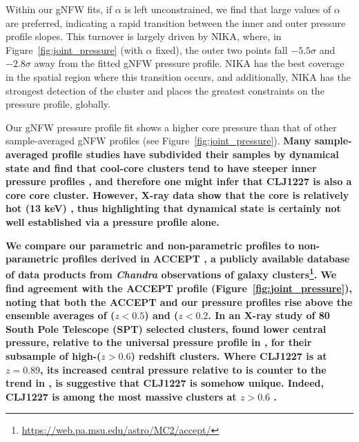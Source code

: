 \documentclass[twocolumn,traditabstract]{aa}
\begin{document}
Within our gNFW fits, if $\alpha$ is left unconstrained, we find that large values of $\alpha$ are preferred, indicating a
rapid transition between the inner and outer pressure profile slopes. This turnover is largely driven by NIKA, where, in
Figure~\ref{fig:joint_pressure} (with $\alpha$ fixed), the outer two points fall $-5.5\sigma$ and $-2.8\sigma$ away from
the fitted gNFW pressure profile. NIKA has the best coverage in the spatial region where this transition occurs, and additionally,
NIKA has the strongest detection of the cluster and places the greatest constraints on the pressure profile, globally.



Our gNFW pressure profile fit shows a higher core pressure than that of other sample-averaged gNFW profiles
(see Figure~\ref{fig:joint_pressure}). \textbf{Many sample-averaged profile studies have subdivided their
  samples by dynamical state and find that cool-core clusters tend to have steeper inner pressure profiles
  \citep[e.g.][]{arnaud2010,planck2013a,sayers2013,romero2017}, and therefore
one might infer that CLJ1227 is also a core core cluster. However, X-ray data show that the core is relatively hot \textbf{(13 keV)}
\citep{maughan2007}, thus highlighting that dynamical state is certainly not well established via a pressure profile alone.}

\textbf{We compare our parametric and non-parametric profiles to non-parametric profiles derived in ACCEPT \citep{cavagnolo2009}, a publicly available database of data products from \emph{Chandra} observations of galaxy clusters\footnote{\url{https://web.pa.msu.edu/astro/MC2/accept/}}. We find agreement with the ACCEPT profile (Figure~\ref{fig:joint_pressure}), noting that both the ACCEPT and our pressure profiles rise above the ensemble averages of \citet{planck2013a} ($z < 0.5$) and  ($z < 0.2$. In an X-ray study of 80 South Pole Telescope (SPT) selected clusters, \citet{mcdonald2014} found lower central pressure, relative to the universal pressure profile in , for their subsample of high-($z > 0.6$) redshift clusters. Where CLJ1227 is at $z=0.89$, its increased central pressure relative to  is counter to the trend in \citet{mcdonald2014}, is suggestive that CLJ1227 is somehow unique. Indeed, CLJ1227 is among the most massive clusters at $z > 0.6$ \citep[e.g.][]{menanteau2012}.}
\end{document}

